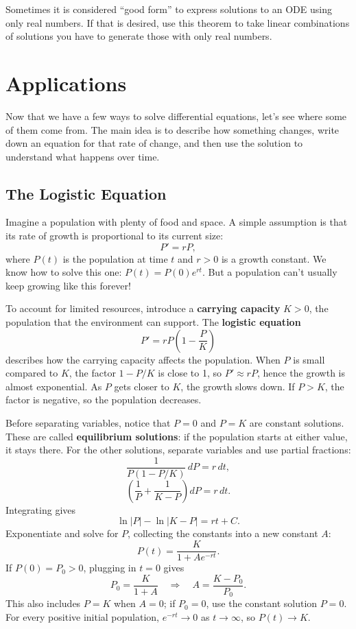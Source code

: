 Sometimes it is considered ``good form'' to express solutions to an ODE using only real numbers. If that is desired, use this theorem to take linear combinations of solutions you have to generate those with only real numbers.

\clearpage
\section{Applications}

Now that we have a few ways to solve differential equations, let's see
where some of them come from. The main idea is to describe how something
changes, write down an equation for that rate of change, and then use the
solution to understand what happens over time.

\subsection{The Logistic Equation}

Imagine a population with plenty of food and space. A simple assumption
is that its rate of growth is proportional to its current size:
$$P'=rP,$$
where $P(t)$ is the population at time $t$ and $r>0$ is a growth constant.
We know how to solve this one: $P(t)=P(0)e^{rt}$. But a population can't
usually keep growing like this forever!

To account for limited resources, introduce a \textbf{carrying capacity}
$K>0$, the population that the environment can support. The
\textbf{logistic equation}
$$P'=rP\left(1-\frac{P}{K}\right)$$
describes how the carrying capacity affects the population. When $P$ is small compared to $K$, the factor $1-P/K$ is close to 1, so $P'\approx rP$, hence
the growth is almost exponential. As $P$ gets closer to $K$, the growth
slows down. If $P>K$, the factor is negative, so the population decreases.

Before separating variables, notice that $P=0$ and $P=K$ are constant
solutions. These are called \textbf{equilibrium solutions}: if the
population starts at either value, it stays there.
For the other solutions, separate variables and use partial fractions:
$$\frac{1}{P(1-P/K)}\,dP=r\,dt,$$
$$\left(\frac1P+\frac1{K-P}\right)dP=r\,dt.$$
Integrating gives
$$\ln|P|-\ln|K-P|=rt+C.$$
Exponentiate and solve for $P$, collecting the constants into a new
constant $A$:
$$P(t)=\frac{K}{1+Ae^{-rt}}.$$
If $P(0)=P_0>0$, plugging in $t=0$ gives
$$P_0=\frac{K}{1+A}
\quad\Longrightarrow\quad A=\frac{K-P_0}{P_0}.$$
This also includes $P=K$ when $A=0$; if $P_0=0$, use the constant
solution $P=0$. For every positive initial population, $e^{-rt}\to0$
as $t\to\infty$, so $P(t)\to K$.

